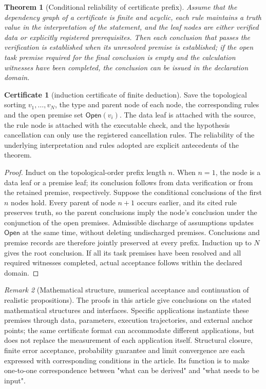 \documentclass[11pt,a4paper]{article}
\theoremstyle{plain}
\newtheorem{theorem}{Theorem}[section]
\theoremstyle{definition}
\newtheorem*{certificate}{Certificate}
\theoremstyle{remark}
\newtheorem{remark}[theorem]{Remark}
\begin{document}
\begin{CJK*}
\begin{theorem}
[Conditional reliability of certificate prefix]\label{thm:certificate-soundness}
Assume that the dependency graph of a certificate is finite and acyclic, each rule maintains a truth value in the interpretation of the statement, and the leaf nodes are either verified data or explicitly registered prerequisites. Then each conclusion that passes the verification is established when its unresolved premise is established; if the open task premise required for the final conclusion is empty and the calculation witnesses have been completed, the conclusion can be issued in the declaration domain.\end{theorem}
\begin{certificate}
[induction certificate of finite deduction]Save the topological sorting $v_1,\ldots,v_N$, the type and parent node of each node, the corresponding rules and the open premise set $\mathsf{Open}(v_i)$. The data leaf is attached with the source, the rule node is attached with the executable check, and the hypothesis cancellation can only use the registered cancellation rules. The reliability of the underlying interpretation and rules adopted are explicit antecedents of the theorem.\end{certificate}
\begin{proof}
Induct on the topological-order prefix length $n$. When $n=1$, the node is a data leaf or a premise leaf; its conclusion follows from data verification or from the retained premise, respectively. Suppose the conditional conclusions of the first $n$ nodes hold. Every parent of node $n+1$ occurs earlier, and its cited rule preserves truth, so the parent conclusions imply the node's conclusion under the conjunction of the open premises. Admissible discharge of assumptions updates $\mathsf{Open}$ at the same time, without deleting undischarged premises. Conclusions and premise records are therefore jointly preserved at every prefix. Induction up to $N$ gives the root conclusion. If all its task premises have been resolved and all required witnesses completed, actual acceptance follows within the declared domain.\end{proof}


\begin{remark}
[Mathematical structure, numerical acceptance and continuation of realistic propositions]The proofs in this article give conclusions on the stated mathematical structures and interfaces. Specific applications instantiate these premises through data, parameters, execution trajectories, and external anchor points; the same certificate format can accommodate different applications, but does not replace the measurement of each application itself. Structural closure, finite error acceptance, probability guarantee and limit convergence are each expressed with corresponding conditions in the article. Its function is to make one-to-one correspondence between "what can be derived" and "what needs to be input".\end{remark}



\end{CJK*}
\end{document}

